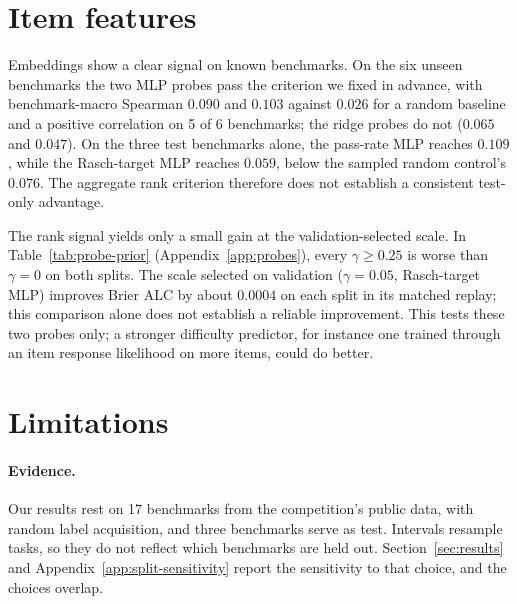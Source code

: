 \section{Item features}
\label{sec:itemfeat-text}
\begin{table}[!t]
\centering
\caption{Item-difficulty transfer: within-benchmark Spearman correlation and pairwise accuracy between predicted easiness and observed pass rate, averaged across benchmarks. ID: items held out within the 11 training benchmarks; OOD validation and OOD test: three unseen benchmarks each. The additional pass-rate and Rasch-target probes use benchmark-grouped selection and were not evaluated on ID (--).}
\label{tab:item-difficulty}
\small\setlength{\tabcolsep}{4pt}

\end{table}

Embeddings show a clear signal on known benchmarks. On the six unseen benchmarks the two MLP probes pass the criterion we fixed in advance, with benchmark-macro Spearman $0.090$ and $0.103$ against $0.026$ for a random baseline and a positive correlation on 5 of 6 benchmarks; the ridge probes do not ($0.065$ and $0.047$). On the three test benchmarks alone, the pass-rate MLP reaches $0.109$, while the Rasch-target MLP reaches $0.059$, below the sampled random control's $0.076$. The aggregate rank criterion therefore does not establish a consistent test-only advantage.

The rank signal yields only a small gain at the validation-selected scale. In Table~\ref{tab:probe-prior} (Appendix~\ref{app:probes}), every $\gamma\ge0.25$ is worse than $\gamma=0$ on both splits. The scale selected on validation ($\gamma=0.05$, Rasch-target MLP) improves Brier ALC by about $0.0004$ on each split in its matched replay; this comparison alone does not establish a reliable improvement. This tests these two probes only; a stronger difficulty predictor, for instance one trained through an item response likelihood on more items, could do better.

\section{Limitations}
\label{sec:limitations}
\paragraph{Evidence.} Our results rest on 17 benchmarks from the competition's public data, with random label acquisition, and three benchmarks serve as test. Intervals resample tasks, so they do not reflect which benchmarks are held out. Section~\ref{sec:results} and Appendix~\ref{app:split-sensitivity} report the sensitivity to that choice, and the choices overlap.

